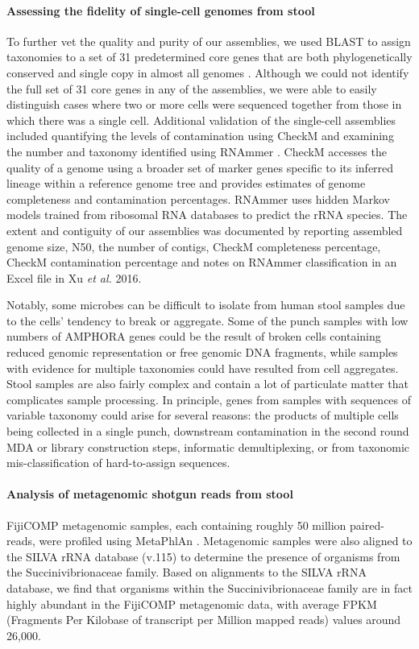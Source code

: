 \paragraph{Assessing the fidelity of single-cell genomes from stool}
To further vet the quality and purity of our assemblies, we used BLAST to assign taxonomies to a set of 31 predetermined core genes that are both phylogenetically conserved and single copy in almost all genomes \cite{Wu:2012dh}. Although we could not identify the full set of 31 core genes in any of the assemblies, we were able to easily distinguish cases where two or more cells were sequenced together from those in which there was a single cell. Additional validation of the single-cell assemblies included quantifying the levels of contamination using CheckM \cite{Parks:2015hs} and examining the number and taxonomy identified using RNAmmer \cite{Lagesen:2007ud}. CheckM accesses the quality of a genome using a broader set of marker genes specific to its inferred lineage within a reference genome tree and provides estimates of genome completeness and contamination percentages. RNAmmer uses hidden Markov models trained from ribosomal RNA databases to predict the rRNA species. The extent and contiguity of our assemblies was documented by reporting assembled genome size, N50, the number of contigs, CheckM completeness percentage, CheckM contamination percentage and notes on RNAmmer classification in an Excel file in Xu \textit{et al.} 2016.

Notably, some microbes can be difficult to isolate from human stool samples due to the cells' tendency to break or aggregate. Some of the punch samples with low numbers of AMPHORA genes could be the result of broken cells containing reduced genomic representation or free genomic DNA fragments, while samples with evidence for multiple taxonomies could have resulted from cell aggregates. Stool samples are also fairly complex and contain a lot of particulate matter that complicates sample processing. In principle, genes from samples with sequences of variable taxonomy could arise for several reasons: the products of multiple cells being collected in a single punch, downstream contamination in the second round MDA or library construction steps, informatic demultiplexing, or from taxonomic mis-classification of hard-to-assign sequences.

\paragraph{Analysis of metagenomic shotgun reads from stool}
FijiCOMP metagenomic samples, each containing roughly 50 million paired-reads, were profiled using MetaPhlAn \cite{Segata:2012ts}. Metagenomic samples were also aligned to the SILVA rRNA database (v.115) to determine the presence of organisms from the Succinivibrionaceae family. Based on alignments to the SILVA rRNA database, we find that organisms within the Succinivibrionaceae family are in fact highly abundant in the FijiCOMP metagenomic data, with average FPKM (Fragments Per Kilobase of transcript per Million mapped reads) values around 26,000.


